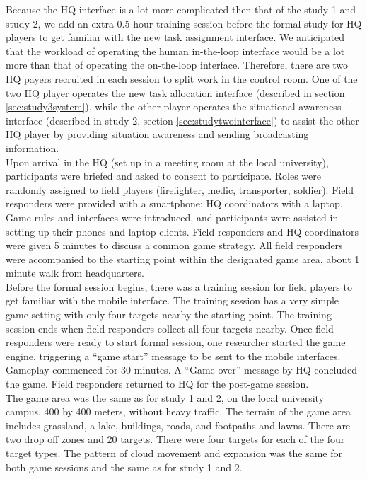 Because the HQ interface is a lot more complicated then that of the study 1 and study 2, we add an extra 0.5 hour training session before the formal study for HQ players to get familiar with the new task assignment interface. We anticipated that the workload of operating the human in-the-loop interface would be a lot more than that of operating the on-the-loop interface. Therefore, there are two HQ payers recruited in each session to split work in the control room. One of the two HQ player operates the new task allocation interface (described in section \ref{sec:study3system}), while the other player operates the situational awareness interface (described in study 2, section \ref{sec:studytwointerface}) to assist the other HQ player by providing situation awareness and sending broadcasting information. \\

Upon arrival in the HQ (set up in a meeting room at the local university), participants were briefed and asked to consent to participate. Roles were randomly assigned to field players (firefighter, medic, transporter, soldier). Field responders were provided with a smartphone; HQ coordinators with a laptop. Game rules and interfaces were introduced, and participants were assisted in setting up their phones and laptop clients. Field responders and HQ coordinators were given 5 minutes to discuss a common game strategy. All field responders were accompanied to the starting point within the designated game area, about 1 minute walk from headquarters.\\

Before the formal session begins, there was a training session for field players to get familiar with the mobile interface. The training session has a very simple game setting with only four targets nearby the starting point. The training session ends when field responders collect all four targets nearby. Once field responders were ready to start formal session, one researcher started the game engine, triggering a ``game start'' message to be sent to the mobile interfaces. Gameplay commenced for 30 minutes. A ``Game over'' message by HQ concluded the game. Field responders returned to HQ for the post-game session.\\

The game area was the same as for study 1 and 2, on the local university campus, 400 by 400 meters, without heavy traffic. The terrain of the game area includes grassland, a lake, buildings, roads, and footpaths and lawns. There are two drop off zones and 20 targets.  There were four targets for each of the four target types. The pattern of cloud movement and expansion was the same for both game sessions and the same as for study 1 and 2.\\

